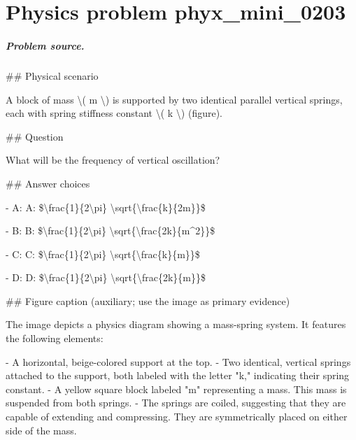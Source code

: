 
\chapter{Physics problem phyx\_mini\_0203}
\label{ch:PhyXMiniProblems_problem_phyx_mini_0203}

\paragraph{Problem source.}
\#\# Physical scenario

A block of mass \textbackslash{}( m \textbackslash{}) is supported by two identical parallel vertical springs, each with spring stiffness constant \textbackslash{}( k \textbackslash{}) (figure).

\#\# Question

What will be the frequency of vertical oscillation?

\#\# Answer choices

- A: A: \$\textbackslash{}frac\{1\}\{2\textbackslash{}pi\} \textbackslash{}sqrt\{\textbackslash{}frac\{k\}\{2m\}\}\$

- B: B: \$\textbackslash{}frac\{1\}\{2\textbackslash{}pi\} \textbackslash{}sqrt\{\textbackslash{}frac\{2k\}\{m\textasciicircum{}2\}\}\$

- C: C: \$\textbackslash{}frac\{1\}\{2\textbackslash{}pi\} \textbackslash{}sqrt\{\textbackslash{}frac\{k\}\{m\}\}\$

- D: D: \$\textbackslash{}frac\{1\}\{2\textbackslash{}pi\} \textbackslash{}sqrt\{\textbackslash{}frac\{2k\}\{m\}\}\$

\#\# Figure caption (auxiliary; use the image as primary evidence)

The image depicts a physics diagram showing a mass-spring system. It features the following elements:

- A horizontal, beige-colored support at the top.
- Two identical, vertical springs attached to the support, both labeled with the letter "k," indicating their spring constant.
- A yellow square block labeled "m" representing a mass. This mass is suspended from both springs.
- The springs are coiled, suggesting that they are capable of extending and compressing. They are symmetrically placed on either side of the mass.

